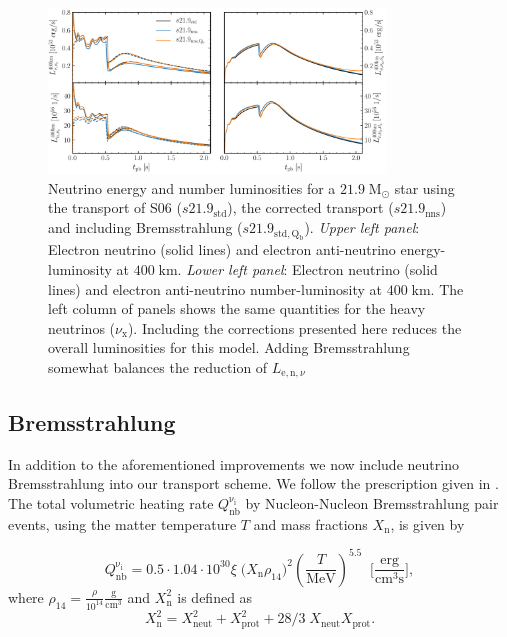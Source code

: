 \documentclass[fleqn,usenatbib]{mnras}
\begin{document}
\begin{appendices}
 \begin{figure}
 \centering
 \includegraphics[width=0.8\textwidth]{./pic/s21_9_trans_tests.pdf}
 \caption{Neutrino energy and number luminosities for a $21.9\;\mathrm{M_{\odot}}$ star using the transport of S06 ($s21.9_{\mathrm{std}}$), the corrected transport ($s21.9_{\mathrm{nns}}$) and including Bremsstrahlung ($s21.9_{\mathrm{std,Q_b}}$). \textit{Upper left panel}: Electron neutrino (solid lines) and electron anti-neutrino energy-luminosity at $400\;\mathrm{km}$. \textit{Lower left panel}: Electron neutrino (solid lines) and electron anti-neutrino number-luminosity at $400\;\mathrm{km}$. The left column of panels shows the same quantities for the heavy neutrinos ($\nu_{\mathrm{x}}$). Including the corrections presented here reduces the overall luminosities for this model. Adding Bremsstrahlung somewhat balances the reduction of $L_{\mathrm{e,n},\nu}$}
 \label{fig:s21.9_tras}
\end{figure}

 \subsection{Bremsstrahlung}

 In addition to the aforementioned improvements we now include neutrino Bremsstrahlung into our transport scheme. We follow the prescription given in \cite{Burrows2006}.
 The total volumetric heating rate $ Q_{\mathrm{nb}}^{\mathrm{\nu_i}}$ by Nucleon-Nucleon Bremsstrahlung pair events, using the matter temperature $T$ and mass fractions $X_{\mathrm{n}}$, is given by

\begin{equation}
    Q_{\mathrm{nb}}^{\mathrm{\nu_i}} = 0.5\cdot 1.04\cdot 10^{30} \xi \; \big(X_{\mathrm{n}}\rho_{14}\big)^2 (\frac{T}{\mathrm{MeV}})^{5.5} \;\; \Big[\frac{\mathrm{erg}}{\mathrm{cm^3s}}\Big],
\end{equation}
where $\rho_{14} = \frac{\rho}{10^{14}} \mathrm{\frac{g}{cm^3}} $
and $X_{\mathrm{n}}^2$ is defined as
\begin{equation*}
 X_{\mathrm{n}}^2 = X_{\mathrm{neut}}^2 + X_{\mathrm{prot}}^2 + 28/3\; X_{\mathrm{neut}}X_{\mathrm{prot}}.
\end{equation*}


\end{appendices}
\end{document}
